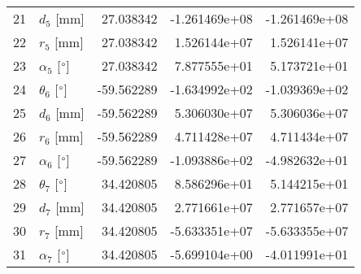 \documentclass{standalone}%
\begin{document}
\begin{tabular}{llrrr}
21 &              $d_{5}$ [mm] &  27.038342 & -1.261469e+08 & -1.261469e+08 \\
22 &              $r_{5}$ [mm] &  27.038342 &  1.526144e+07 &  1.526141e+07 \\
23 &  $\alpha_{5}$ [$\degree$] &  27.038342 &  7.877555e+01 &  5.173721e+01 \\
24 &  $\theta_{6}$ [$\degree$] & -59.562289 & -1.634992e+02 & -1.039369e+02 \\
25 &              $d_{6}$ [mm] & -59.562289 &  5.306030e+07 &  5.306036e+07 \\
26 &              $r_{6}$ [mm] & -59.562289 &  4.711428e+07 &  4.711434e+07 \\
27 &  $\alpha_{6}$ [$\degree$] & -59.562289 & -1.093886e+02 & -4.982632e+01 \\
28 &  $\theta_{7}$ [$\degree$] &  34.420805 &  8.586296e+01 &  5.144215e+01 \\
29 &              $d_{7}$ [mm] &  34.420805 &  2.771661e+07 &  2.771657e+07 \\
30 &              $r_{7}$ [mm] &  34.420805 & -5.633351e+07 & -5.633355e+07 \\
31 &  $\alpha_{7}$ [$\degree$] &  34.420805 & -5.699104e+00 & -4.011991e+01 \\
\bottomrule
\end{tabular}
%
\end{document}
